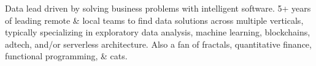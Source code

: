 

\begin{cvparagraph}
	Data lead driven by solving business problems with intelligent
	software. 5+ years of
	leading remote \& local teams to find data solutions across multiple
	verticals,  typically specializing in exploratory data analysis, machine
	learning, blockchains, adtech, and/or serverless architecture. Also a fan of fractals, quantitative finance, functional programming, \& cats.
\end{cvparagraph}


